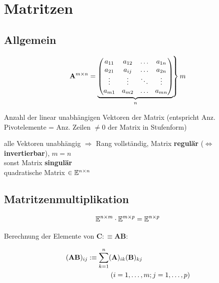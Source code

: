 \section{Matritzen}
	
	\subsection{Allgemein}
	
		\[
			\mA^{m \times n} = 					
			\underbrace{
				\begin{pmatrix}
					a_{11} 	& a_{12} & \ldots & a_{1n} \\
					a_{21} 	& a_{ij} & \ldots & a_{2n} \\
					\vdots 	& \vdots & \ddots & \vdots \\
					a_{m1}	&a _{m2} & \ldots & a_{mn} 
				\end{pmatrix} 
			}_{n} 
			\left. 
			\begin{array}{c} \\ \\ \\ \\ \\ \end{array} 
			\hspace{-5mm} \right\rbrace  m
		\]
		
		\begin{fdef}[Rang]
			Anzahl der linear unabhängigen Vektoren der Matrix (entspricht Anz. 
			Pivotelemente = Anz. Zeilen $\ne 0$ der Matrix in Stufenform)
		\end{fdef}
		
		alle Vektoren unabhängig $\Rightarrow$ Rang vollständig, Matrix 
		\textbf{regulär} ($\Leftrightarrow$ \textbf{invertierbar}), $m = n$\\
		sonst Matrix \textbf{singulär} \\[-2mm]
		
		quadratische Matrix $\in \mathbb{E}^{n \times n}$

		
	\subsection{Matritzenmultiplikation}
	
    	\[
    		\mathbb{E}^{n \times m} \cdot \mathbb{E}^{m \times p} 
    		= \mathbb{E}^{n \times p}
    	\]
    	
    	
    	
    	Berechnung der Elemente von $\mathbf{C} :\equiv \mathbf{AB}$:
    	
    	\begin{align*}
    		(\mathbf{AB})_{ij} & :\equiv 
    		\sum_{k=1}^{n} (\mathbf{A})_{ik} (\mathbf{B})_{kj} \\
    		&\mathrel{\phantom{=}} \qquad (i = 1, \dots ,m; j = 1, \dots ,p)
    	\end{align*}
    	
